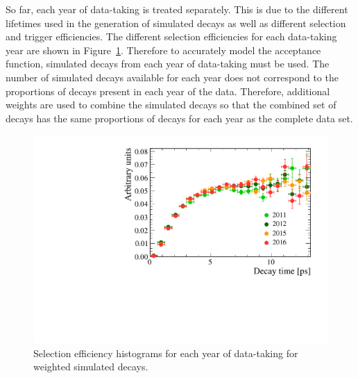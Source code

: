 So far, each year of data-taking is treated separately. This is due to the different \bs lifetimes used in the generation of simulated decays as well as different selection and trigger efficiencies. The different selection efficiencies for each data-taking year are shown in Figure~\ref{fig:accptplotyrs}. Therefore to accurately model the \bsmumu acceptance function, simulated decays from each year of data-taking must be used. The number of simulated decays available for each year does not correspond to the proportions of decays present in each year of the data. Therefore, additional weights are used to combine the simulated decays so that the combined set of decays has the same proportions of decays for each year as the complete data set. 


\begin{figure}[h!]
    \centering
        \includegraphics[width= 0.8 \textwidth]{./Figs/LifetimeMeasurement/Acceptance_per_year.pdf}
    \caption{Selection efficiency histograms for each year of data-taking for weighted simulated \bsmumu decays. }
    \label{fig:accptplotyrs}
\end{figure}


